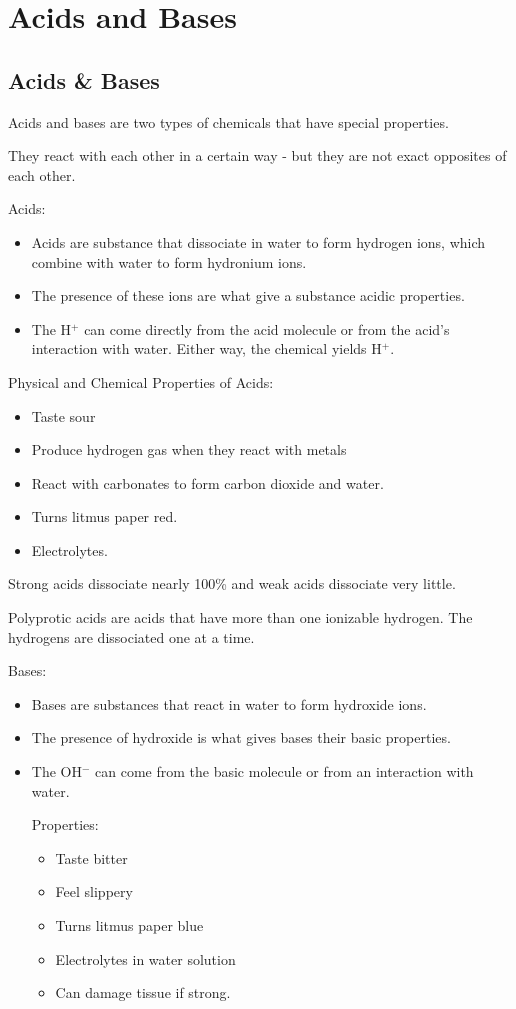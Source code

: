 \documentclass[../hchem.tex]{subfiles}
\begin{document}
\chapter{Acids and Bases}
\section{Acids \& Bases}
Acids and bases are two types of chemicals that have special properties.

They react with each other in a certain way - but they are not exact opposites of each other.

Acids:
\begin{itemize}
    \item Acids are substance that dissociate in water to form hydrogen ions, which combine with water to form hydronium ions.
    \item The presence of these ions are what give a substance acidic properties.
    \item The H$^+$ can come directly from the acid molecule or from the acid's interaction with water. Either way, the chemical yields H$^+$.
\end{itemize}

Physical and Chemical Properties of Acids:
\begin{itemize}
    \item Taste sour 
    \item Produce hydrogen gas when they react with metals 
    \item React with carbonates to form carbon dioxide and water.
    \item Turns litmus paper red.
    \item Electrolytes.
\end{itemize}

Strong acids dissociate nearly 100\% and weak acids dissociate very little.

Polyprotic acids are acids that have more than one ionizable hydrogen. The hydrogens are dissociated one at a time.

Bases:
\begin{itemize}
    \item Bases are substances that react in water to form hydroxide ions.
    \item The presence of hydroxide is what gives bases their basic properties.
    \item The OH$^-$ can come from the basic molecule or from an interaction with water.
    
    Properties:
    \begin{itemize}
        \item Taste bitter 
        \item Feel slippery
        \item Turns litmus paper blue 
        \item Electrolytes in water solution 
        \item Can damage tissue if strong.
    \end{itemize}
\end{itemize}
\end{document}
